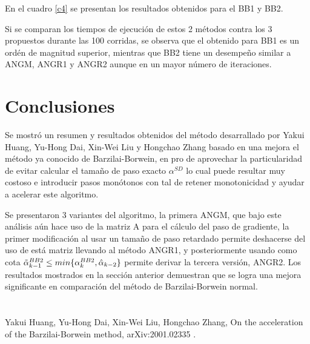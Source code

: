 \documentclass[conference]{IEEEtran}
\begin{document}
    En el cuadro \ref{c4} se presentan los resultados obtenidos para el BB1 y BB2.
    \begin{table}[H]
    \centering
    \caption{Función Wood puntos aleatorios promedios 100 corridas}
    \label{c4}
    \end{table}

    Si se comparan los tiempos de ejecución de estos 2 métodos contra los 3 propuestos durante las 100 corridas, se observa que el obtenido para BB1 es un ordén de magnitud superior, mientras que BB2 tiene un desempeño similar  a ANGM, ANGR1 y ANGR2 aunque en un mayor número de iteraciones.



\section{Conclusiones}

Se mostró un resumen y resultados obtenidos del método desarrallado por Yakui Huang, Yu-Hong Dai, Xin-Wei Liu y Hongchao Zhang basado en una mejora el método ya conocido de Barzilai-Borwein, en pro de aprovechar la particularidad de evitar calcular el tamaño de paso exacto $\alpha^{SD}$ lo cual puede resultar muy costoso e introducir pasos monótonos con tal de retener monotonicidad y ayudar a acelerar este algoritmo.

Se presentaron 3 variantes del algoritmo, la primera ANGM, que bajo este análisis aún hace uso de la matriz A para el cálculo del paso de gradiente, la primer modificación al usar un tamaño de paso retardado permite deshacerse del uso de está matriz llevando al método ANGR1, y posteriormente usando como cota $\Tilde{\alpha}_{k-1}^{BB2} \leq min\{\alpha_k^{BB2}, \hat{\alpha}_{k-2}\}$ permite derivar la tercera versión, ANGR2. Los resultados mostrados en la sección anterior demuestran que se logra una mejora significante en comparación del método de Barzilai-Borwein normal.

\section*{}

\begin{thebibliography}{00}
 Yakui Huang, Yu-Hong Dai, Xin-Wei Liu, Hongchao Zhang, On the acceleration of the Barzilai-Borwein method, arXiv:2001.02335
.
\end{thebibliography}
\end{document}

